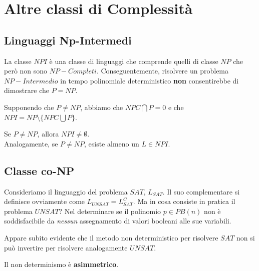 \section{Altre classi di Complessità}

\subsection{Linguaggi Np-Intermedi}

La classe $NPI$ è una classe di linguaggi che comprende quelli di classe $NP$ che però non sono $NP-Completi$. Conseguentemente, risolvere un problema $NP-Intermedio$ in tempo polinomiale deterministico \textbf{non} consentirebbe di dimostrare che $P=NP$.

Supponendo che $P \neq NP$, abbiamo che $NPC \bigcap P = 0$ e che $NPI = NP \setminus \{NPC \bigcup P\}$.

\begin{lemm}
	Se $P \neq NP$, allora $NPI \neq \emptyset$. \\ Analogamente, se $P \neq NP$, esiste almeno un $L \in NPI$.
\end{lemm}

\subsection{Classe co-NP}

Consideriamo il linguaggio del problema $SAT$, $L_{SAT}$. Il suo complementare si definisce ovviamente come $L_{UNSAT} = L_{SAT	}^C$. Ma in cosa consiste in pratica il problema $UNSAT$? Nel determinare se il polinomio $p \in PB(n)$ non è soddisfacibile da \textit{nessun} assegnamento di valori booleani alle sue variabili.

Appare subito evidente che il metodo non deterministico per risolvere $SAT$ non si può invertire per risolvere analogamente $UNSAT$. \\

\begin{remark}
	Il non determinismo è \textbf{asimmetrico}.
\end{remark}
